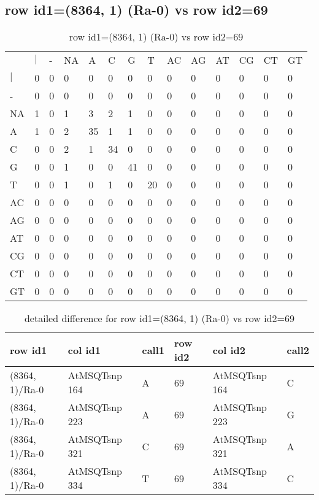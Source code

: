 \subsection{row id1=(8364, 1) (Ra-0) vs row id2=69}
\begin{center}
\begin{longtable}{|l|l|l|l|l|l|l|l|l|l|l|l|l|l|}
\caption{row id1=(8364, 1) (Ra-0) vs row id2=69} \label{table_dm392}\\
\hline
\\
\hline
&$|$&-&NA&A&C&G&T&AC&AG&AT&CG&CT&GT\\
$|$&0&0&0&0&0&0&0&0&0&0&0&0&0\\
-&0&0&0&0&0&0&0&0&0&0&0&0&0\\
NA&1&0&1&3&2&1&0&0&0&0&0&0&0\\
A&1&0&2&35&1&1&0&0&0&0&0&0&0\\
C&0&0&2&1&34&0&0&0&0&0&0&0&0\\
G&0&0&1&0&0&41&0&0&0&0&0&0&0\\
T&0&0&1&0&1&0&20&0&0&0&0&0&0\\
AC&0&0&0&0&0&0&0&0&0&0&0&0&0\\
AG&0&0&0&0&0&0&0&0&0&0&0&0&0\\
AT&0&0&0&0&0&0&0&0&0&0&0&0&0\\
CG&0&0&0&0&0&0&0&0&0&0&0&0&0\\
CT&0&0&0&0&0&0&0&0&0&0&0&0&0\\
GT&0&0&0&0&0&0&0&0&0&0&0&0&0\\
\hline
\end{longtable}
\end{center}

\begin{center}
\begin{longtable}{|l|l|l|l|l|l|}
\caption{detailed difference for row id1=(8364, 1) (Ra-0) vs row id2=69} \label{table_dm393}\\
\hline
row id1&col id1&call1&row id2&col id2&call2\\
\hline
(8364, 1)/Ra-0&AtMSQTsnp 164&A&69&AtMSQTsnp 164&C\\
(8364, 1)/Ra-0&AtMSQTsnp 223&A&69&AtMSQTsnp 223&G\\
(8364, 1)/Ra-0&AtMSQTsnp 321&C&69&AtMSQTsnp 321&A\\
(8364, 1)/Ra-0&AtMSQTsnp 334&T&69&AtMSQTsnp 334&C\\
\hline
\end{longtable}
\end{center}

